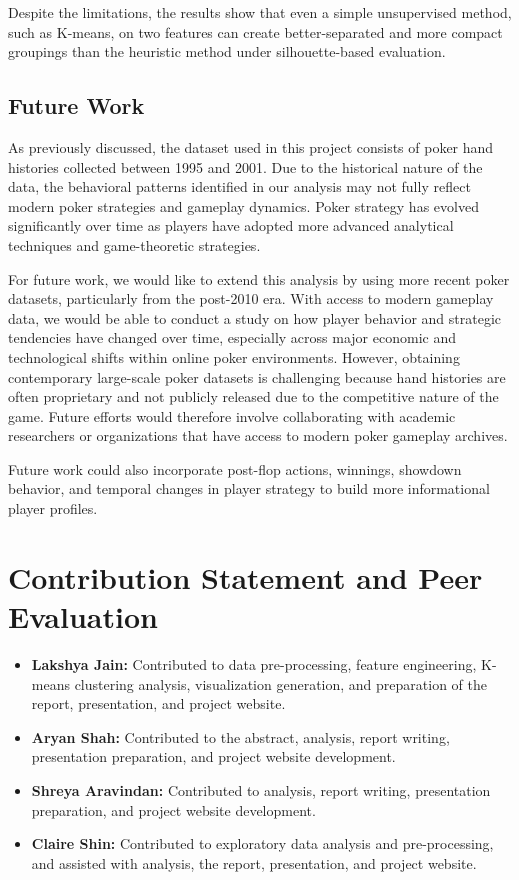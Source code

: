 \documentclass[sigconf]{acmart}
\begin{document}
Despite the limitations, the results show that even a simple unsupervised method, such as K-means, on two features can create better-separated and more compact groupings than the heuristic method under silhouette-based evaluation.

\subsection{Future Work}
As previously discussed, the dataset used in this project consists of poker hand histories collected between 1995 and 2001. Due to the historical nature of the data, the behavioral patterns identified in our analysis may not fully reflect modern poker strategies and gameplay dynamics. Poker strategy has evolved significantly over time as players have adopted more advanced analytical techniques and game-theoretic strategies.

For future work, we would like to extend this analysis by using more recent poker datasets, particularly from the post-2010 era. With access to modern gameplay data, we would be able to conduct a study on how player behavior and strategic tendencies have changed over time, especially across major economic and technological shifts within online poker environments. However, obtaining contemporary large-scale poker datasets is challenging because hand histories are often proprietary and not publicly released due to the competitive nature of the game. Future efforts would therefore involve collaborating with academic researchers or organizations that have access to modern poker gameplay archives.

Future work could also incorporate post-flop actions, winnings, showdown behavior, and temporal changes in player strategy to build more informational player profiles.

\section{Contribution Statement and Peer Evaluation}
\begin{itemize}
    \item \textbf{Lakshya Jain: } Contributed to data pre-processing, feature engineering, K-means clustering analysis, visualization generation, and preparation of the report, presentation, and project website.
    \item \textbf{Aryan Shah: } Contributed to the abstract, analysis, report writing, presentation preparation, and project website development.
    \item \textbf{Shreya Aravindan: } Contributed to analysis, report writing, presentation preparation, and project website development.
    \item \textbf{Claire Shin: } Contributed to exploratory data analysis and pre-processing, and assisted with analysis, the report, presentation, and project website.
\end{itemize}



\end{document}
